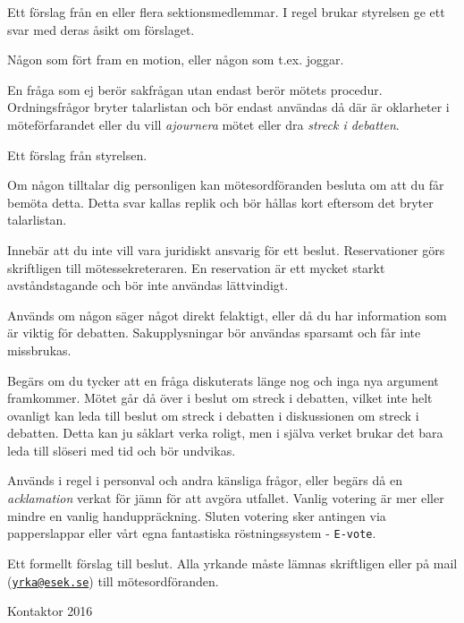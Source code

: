 \documentclass[../_main/handlingar.tex]{subfiles}
\begin{document}
\begin{description}[style=multiline, leftmargin=45mm]
    \item[Motion]
    Ett förslag från en eller flera sektionsmedlemmar. I regel brukar styrelsen ge ett svar med deras åsikt om förslaget.
    \item[Motionär] Någon som fört fram en motion, eller någon som t.ex. joggar.
    \item[Ordningsfråga]
    En fråga som ej berör sakfrågan utan endast berör mötets procedur. Ordningsfrågor bryter talarlistan och bör endast användas då där är oklarheter i möteförfarandet eller du vill \emph{ajournera} mötet eller dra \emph{streck i debatten}.
    \item[Proposition]
    Ett förslag från styrelsen.
    \item[Replik]
    Om någon tilltalar dig personligen kan mötesordföranden besluta om att du får bemöta detta. Detta svar kallas replik och bör hållas kort eftersom det bryter talarlistan.
    \item[Reservation]
    Innebär att du inte vill vara juridiskt ansvarig för ett beslut. Reservationer görs skriftligen till mötessekreteraren. En reservation är ett mycket starkt avståndstagande och bör inte användas lättvindigt.
    \item[Sakupplysning]
    Används om någon säger något direkt felaktigt, eller då du har information som är viktig för debatten. Sakupplysningar bör användas sparsamt och får inte missbrukas.
    \item[Streck i debatten]
    Begärs om du tycker att en fråga diskuterats länge nog och inga nya argument framkommer. Mötet går då över i beslut om streck i debatten, vilket inte helt ovanligt kan leda till beslut om streck i debatten i diskussionen om streck i debatten. Detta kan ju såklart verka roligt, men i själva verket brukar det bara leda till slöseri med tid och bör undvikas.
    \item[Votering]
    Används i regel i personval och andra känsliga frågor, eller begärs då en \emph{acklamation} verkat för jämn för att avgöra utfallet. Vanlig votering är mer eller mindre en vanlig handuppräckning. Sluten votering sker antingen via papperslappar eller vårt egna fantastiska röstningssystem - \texttt{E-vote}.
    \item[Yrkande]
    Ett formellt förslag till beslut. Alla yrkande måste lämnas skriftligen eller på mail (\href{mailto:yrka@esek.se}{\texttt{yrka@esek.se}}) till mötesordföranden.
\end{description}

\begin{signatures}{1}
    \mvh
    \signature{Erik Månsson}{Kontaktor 2016}
\end{signatures}
\end{document}

